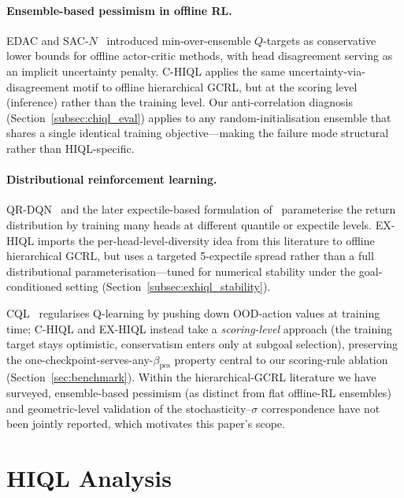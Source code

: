 \documentclass[11pt]{article}
\begin{document}
\paragraph{Ensemble-based pessimism in offline RL.}
EDAC and SAC-$N$~\citep{an2021edac} introduced min-over-ensemble $Q$-targets
as conservative lower bounds for offline actor-critic methods, with head
disagreement serving as an implicit uncertainty penalty.
C-HIQL applies the same uncertainty-via-disagreement motif to offline
hierarchical GCRL, but at the scoring level (inference) rather than the
training level.
Our anti-correlation diagnosis (Section~\ref{subsec:chiql_eval}) applies
to any random-initialisation ensemble that shares a single identical
training objective---making the failure mode structural rather than
HIQL-specific.

\paragraph{Distributional reinforcement learning.}
QR-DQN~\citep{dabney2018qrdqn} and the later expectile-based formulation
of~\citet{rowland2019expectile} parameterise the return distribution by
training many heads at different quantile or expectile levels.
EX-HIQL imports the per-head-level-diversity idea from this literature to
offline hierarchical GCRL, but uses a targeted 5-expectile spread rather
than a full distributional parameterisation---tuned for numerical
stability under the goal-conditioned setting
(Section~\ref{subsec:exhiql_stability}).

CQL~\citep{kumar2020cql} regularises Q-learning by pushing down OOD-action
values at training time; C-HIQL and EX-HIQL instead take a
\emph{scoring-level} approach (the training target stays optimistic,
conservatism enters only at subgoal selection), preserving the
one-checkpoint-serves-any-$\beta_\text{pes}$ property central to our
scoring-rule ablation (Section~\ref{sec:benchmark}).
Within the hierarchical-GCRL literature we have surveyed, ensemble-based
pessimism (as distinct from flat offline-RL ensembles) and geometric-level
validation of the stochasticity--$\sigma$ correspondence have not been
jointly reported, which motivates this paper's scope.

\section{HIQL Analysis}
\label{sec:hiql_analysis}

\end{document}
